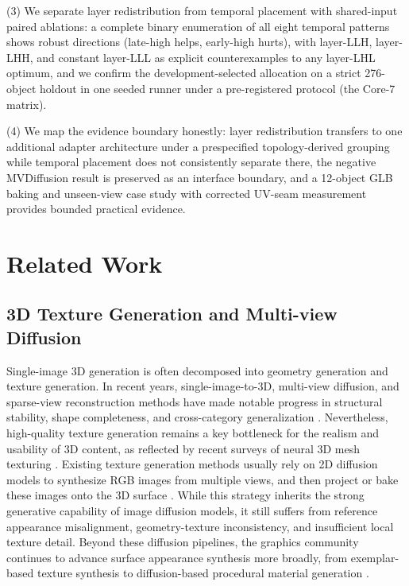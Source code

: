\documentclass[times,twocolumn,final]{elsarticle}
\begin{document}
(3) We separate layer redistribution from temporal placement with shared-input paired ablations: a complete binary enumeration of all eight temporal patterns shows robust directions (late-high helps, early-high hurts), with layer-LLH, layer-LHH, and constant layer-LLL as explicit counterexamples to any layer-LHL optimum, and we confirm the development-selected allocation on a strict 276-object holdout in one seeded runner under a pre-registered protocol (the Core-7 matrix).

(4) We map the evidence boundary honestly: layer redistribution transfers to one additional adapter architecture under a prespecified topology-derived grouping while temporal placement does not consistently separate there, the negative MVDiffusion result is preserved as an interface boundary, and a 12-object GLB baking and unseen-view case study with corrected UV-seam measurement provides bounded practical evidence.

\section{Related Work}
\label{sec:related}

\subsection{3D Texture Generation and Multi-view Diffusion}
\label{subsec:3dtex}

Single-image 3D generation is often decomposed into geometry generation and texture generation. In recent years, single-image-to-3D, multi-view diffusion, and sparse-view reconstruction methods have made notable progress in structural stability, shape completeness, and cross-category generalization \cite{liu2023zero1to3,shi2023zero123pp,liu2023syncdreamer,long2023wonder3d,shi2024mvdream,wang2023imagedream,xu2024instantmesh,ke2024era3d}. Nevertheless, high-quality texture generation remains a key bottleneck for the realism and usability of 3D content, as reflected by recent surveys of neural 3D mesh texturing \cite{perla2026survey}. Existing texture generation methods usually rely on 2D diffusion models to synthesize RGB images from multiple views, and then project or bake these images onto the 3D surface \cite{chen2023text2tex,richardson2023texture,poole2023dreamfusion,chen2023fantasia3d}. While this strategy inherits the strong generative capability of image diffusion models, it still suffers from reference appearance misalignment, geometry-texture inconsistency, and insufficient local texture detail. Beyond these diffusion pipelines, the graphics community continues to advance surface appearance synthesis more broadly, from exemplar-based texture synthesis \cite{guzman2026adaptive} to diffusion-based procedural material generation \cite{lv2025interpretable}.
\end{document}
